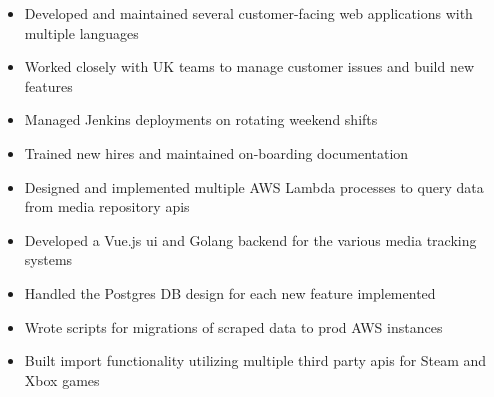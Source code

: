 \documentclass[10pt,a4paper,ragged2e]{altacv}
\begin{document}


\begin{fullwidth}
\makecvheader
\end{fullwidth}



\begin{itemize}
\item Developed and maintained several customer-facing web applications with multiple languages
\item Worked closely with UK teams to manage customer issues and build new features
\item Managed Jenkins deployments on rotating weekend shifts
\item Trained new hires and maintained on-boarding documentation
\end{itemize}

\divider

\begin{itemize}
\item Designed and implemented multiple AWS Lambda processes to query data from media repository apis
\item Developed a Vue.js ui and Golang backend for the various media tracking systems 
\item Handled the Postgres DB design for each new feature implemented
\item Wrote scripts for migrations of scraped data to prod AWS instances
\item Built import functionality utilizing multiple third party apis for Steam and Xbox games
\end{itemize}
\end{document}
